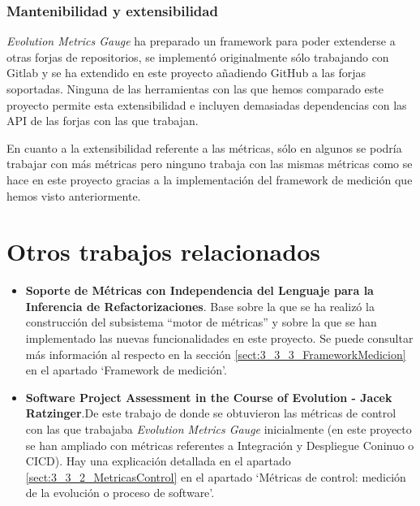 \newpage
\subsubsection{Mantenibilidad y extensibilidad}

\textit{Evolution Metrics Gauge} ha preparado un framework para poder extenderse a otras forjas de repositorios, se implementó originalmente sólo trabajando con Gitlab y se ha extendido en este proyecto añadiendo GitHub a las forjas soportadas. Ninguna de las herramientas con las que hemos comparado este proyecto permite esta extensibilidad e incluyen demasiadas dependencias con las API de las forjas con las que trabajan.

En cuanto a la extensibilidad referente a las métricas, sólo en algunos se podría trabajar con más métricas pero ninguno trabaja con las mismas métricas como se hace en este proyecto gracias a la implementación del framework de medición que hemos visto anteriormente.

\section{Otros trabajos relacionados}
\begin{itemize}
	\item \textbf{Soporte de Métricas con Independencia del Lenguaje para la Inferencia de Refactorizaciones}. Base sobre la que se ha realizó la construcción del subsistema ``motor de métricas'' y sobre la que se han implementado las nuevas funcionalidades en este proyecto. Se puede consultar más información al respecto en la sección \ref{sect:3_3_3_FrameworkMedicion} en el apartado `Framework de medición'.
	
	\item \textbf{Software Project Assessment in the Course of Evolution -  Jacek Ratzinger}.De este trabajo de donde se obtuvieron las métricas de control con las que trabajaba \textit{Evolution Metrics Gauge} inicialmente (en este proyecto se han ampliado con métricas referentes a Integración y Despliegue Coninuo o CICD). Hay una explicación detallada en el apartado \ref{sect:3_3_2_MetricasControl} en el apartado `Métricas de control: medición de la evolución o proceso de software'.
\end{itemize}